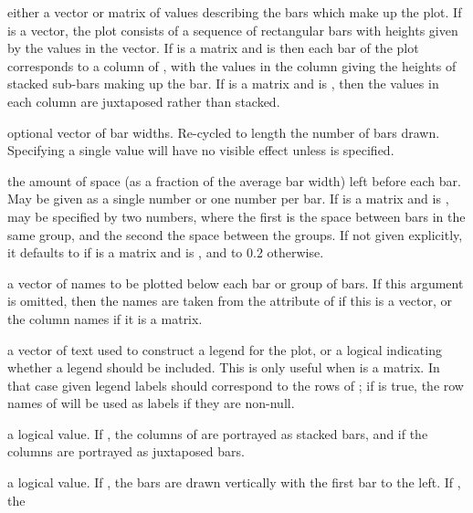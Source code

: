 \begin{Arguments}
\begin{ldescription}
\item[\code{height}] either a vector or matrix of values describing the
bars which make up the plot.  If  is a vector, the
plot consists of a sequence of rectangular bars with heights
given by the values in the vector.  If  is a matrix
and  is  then each bar of the plot
corresponds to a column of , with the values in the
column giving the heights of stacked sub-bars making up the
bar.  If  is a matrix and  is
, then the values in each column are juxtaposed
rather than stacked.
\item[\code{width}] optional vector of bar widths. Re-cycled to length the
number of bars drawn.  Specifying a single value will have no 
visible effect unless  is specified.
\item[\code{space}] the amount of space (as a fraction of the average bar
width) left before each bar.  May be given as a single number or
one number per bar.  If  is a matrix and
 is ,  may be specified by
two numbers, where the first is the space between bars in the
same group, and the second the space between the groups.  If not
given explicitly, it defaults to  if 
is a matrix and  is , and to 0.2
otherwise.
\item[\code{names.arg}] a vector of names to be plotted below each bar or
group of bars.  If this argument is omitted, then the names are
taken from the  attribute of  if this
is a vector, or the column names if it is a matrix.
\item[\code{legend.text}] a vector of text used to construct a legend for
the plot, or a logical indicating whether a legend should be
included.  This is only useful when  is a matrix.
In that case given legend labels should correspond to the rows of
; if  is true, the row names of
 will be used as labels if they are non-null.
\item[\code{beside}] a logical value.  If , the columns of
 are portrayed as stacked bars, and if 
the columns are portrayed as juxtaposed bars.
\item[\code{horiz}] a logical value.  If , the bars are drawn
vertically with the first bar to the left.  If , the

\end{ldescription}
\end{Arguments}

